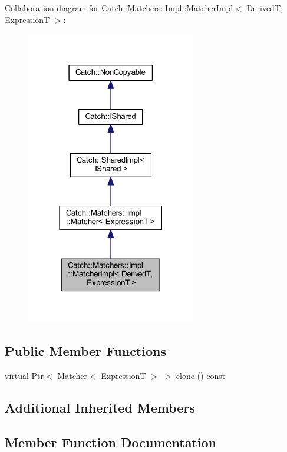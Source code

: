 Collaboration diagram for Catch\+:\+:Matchers\+:\+:Impl\+:\+:Matcher\+Impl$<$ DerivedT, ExpressionT $>$\+:\nopagebreak
\begin{figure}[H]
\begin{center}
\leavevmode
\includegraphics[width=210pt]{struct_catch_1_1_matchers_1_1_impl_1_1_matcher_impl__coll__graph}
\end{center}
\end{figure}
\subsection*{Public Member Functions}
\begin{DoxyCompactItemize}
\item 
virtual \hyperlink{class_catch_1_1_ptr}{Ptr}$<$ \hyperlink{struct_catch_1_1_matchers_1_1_impl_1_1_matcher}{Matcher}$<$ ExpressionT $>$ $>$ \hyperlink{struct_catch_1_1_matchers_1_1_impl_1_1_matcher_impl_af7cf4b7b730145d4455dc356490e6b77}{clone} () const
\end{DoxyCompactItemize}
\subsection*{Additional Inherited Members}


\subsection{Member Function Documentation}
\hypertarget{struct_catch_1_1_matchers_1_1_impl_1_1_matcher_impl_af7cf4b7b730145d4455dc356490e6b77}{}\label{struct_catch_1_1_matchers_1_1_impl_1_1_matcher_impl_af7cf4b7b730145d4455dc356490e6b77} 
